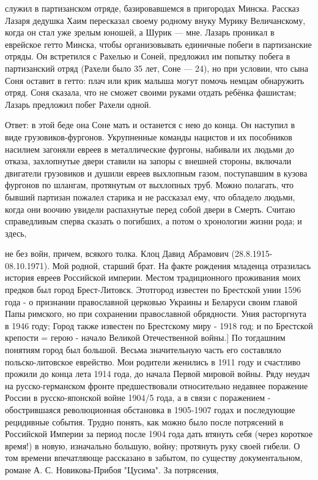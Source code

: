 \label{063-1}
служил в партизанском отряде, базировавшемся в пригородах Минска. Рассказ Лазаря дедушка Хаим пересказал своему родному внуку Мурику Величанскому, когда он стал уже зрелым юношей, а Шурик — мне. Лазарь проникал в еврейское гетто Минска, чтобы организовывать единичные побеги в партизанские отряды. Он встретился с Рахелью и Соней, предложил им попытку побега в партизанский отряд (Рахели было 35 лет, Соне — 24), но при условии, что сына Соня оставит в гетто: плач или крик малыша могут помочь немцам обнаружить отряд. Соня сказала, что не сможет своими руками отдать ребёнка фашистам; Лазарь предложил побег Рахели одной.

\label{064-1}
Ответ: в этой беде она Соне мать и останется с нею до конца. Он наступил в виде грузовиков-фургонов. Укрупненные команды нацистов и их пособников насилием загоняли евреев в металлические фургоны, набивали их людьми до отказа, захлопнутые двери ставили на запоры с внешней стороны, включали двигатели грузовиков и душили евреев выхлопным газом, поступавшим в кузова фургонов по шлангам, протянутым от выхлопных труб. Можно полагать, что бывший партизан пожалел старика и не рассказал ему, что обладело людьми, когда они воочию увидели распахнутые перед собой двери в Смерть. 
Считаю справедливым сперва сказать о погибших, а потом о хронологии жизни рода; и здесь,

\label{065-1}
не без войн, причем, всякого толка.
Клоц Давид Абрамович (28.8.1915-08.10.1971). Мой родной, старший брат. На факте рождения младенца отразилась история евреев Российской империи. Местом традиционного проживания моих предков был город Брест-Литовск. Этотгород известен по Брестской унии 1596 года - о признании православной церковью Украины и Беларуси своим главой Папы римского, но при сохранении православной обрядности. Уния расторгнута в 1946 году; Город также известен по Брестскому миру - 1918 год; и по Брестской крепости = герою - начало Великой Отечественной войны.]
По тогдашним понятиям город был большой. Весьма значительную часть его составляло польско-литовское еврейство. Мои родители женились в 1911 году и счастливо прожили до конца лета 1914 года, до начала Первой мировой войны.
Ряду неудач на русско-германском фронте предшествовали относительно недавнее поражение России в русско-японской войне 1904/5 года, а в связи с поражением - обострившаяся революционная обстановка в 1905-1907 годах и последующие рецидивные события.
Трудно понять, как можно было после потрясений в Российской Империи за период после 1904 года дать втянуть себя (через короткое время!) в новую, изначально большую, войну; протянуть руку своей гибели. О том времени впечатляюще рассказано в забытом, по существу документальном, романе А. С. Новикова-Прибоя "Цусима". За потрясения,

